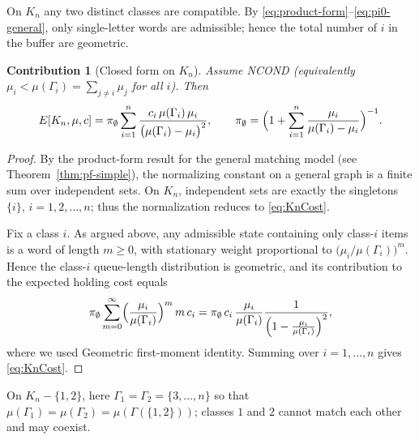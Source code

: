 \documentclass[11pt]{article}
\newtheorem{contribution}{Contribution}
\begin{document}
On $K_n$ any two distinct classes are compatible. By \eqref{eq:product-form}–\eqref{eq:pi0-general}, only single-letter words are admissible; hence the total number of $i$ in the buffer are geometric.

\begin{contribution}[Closed form on $K_n$]\label{prop:Kn}
	Assume \textsc{NCOND} (equivalently $\mu_i<\mu(\Gamma_i)=\sum_{j\neq i}\mu_j$ for all $i$).
	Then
	\begin{equation}\label{eq:KnCost}
		E[K_n,\mu,c]=\pi_{\emptyset}\sum_{i=1}^n\frac{c_i\,\mu(\Gamma_i)\,\mu_i}{\bigl(\mu(\Gamma_i)-\mu_i\bigr)^2},
		\qquad
		\pi_{\emptyset}
		=\Bigl(1+\sum_{i=1}^n \frac{\mu_i}{\mu(\Gamma_i)-\mu_i}\Bigr)^{-1}.
	\end{equation}
\end{contribution}

\begin{proof}
	By the product-form result for the general matching model (see Theorem~\ref{thm:pf-simple}),
	the normalizing constant on a general graph is a finite sum over independent sets.
	On $K_n$, independent sets are exactly the singletons $\{i\}$, $i=1,2,\dots,n$; thus the normalization reduces to \eqref{eq:KnCost}.
	
	Fix a class $i$. As argued above, any admissible state containing only class-$i$ items is
	a word of length $m\ge 0$, with stationary weight proportional to $\bigl(\mu_i/\mu(\Gamma_i)\bigr)^m$.
	Hence the class-$i$ queue-length distribution is geometric, and its contribution to the
	expected holding cost equals
	\[
	\pi_\emptyset \sum_{m=0}^{\infty} \Bigl(\frac{\mu_i}{\mu(\Gamma_i)}\Bigr)^{m} \, m\, c_i
	=\pi_\emptyset \, c_i \,\frac{\mu_i}{\mu(\Gamma_i)}
	\frac{1}{\Bigl(1-\frac{\mu_i}{\mu(\Gamma_i)}\Bigr)^2},
	\]
	where we used Geometric first-moment identity. Summing over $i=1,\dots,n$ gives \eqref{eq:KnCost}.
\end{proof}

On $K_n-\{1,2\}$, here $\Gamma_1=\Gamma_2=\{3,\dots,n\}$ so that $\mu(\Gamma_1)=\mu(\Gamma_2)=\mu(\Gamma(\{1,2\}))$; classes $1$ and $2$ cannot match each other and may coexist.
\end{document}
